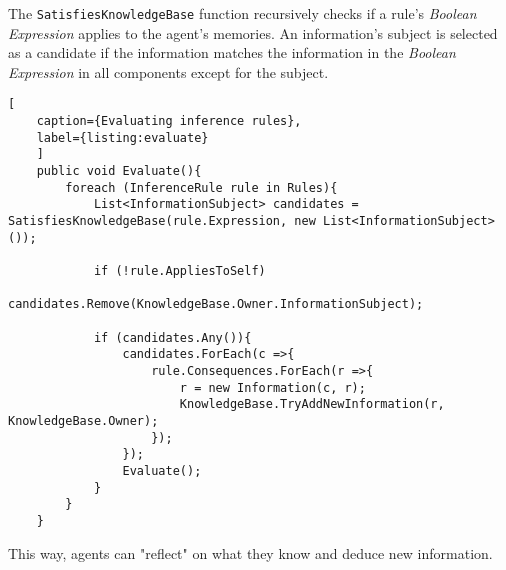 The \verb|SatisfiesKnowledgeBase| function recursively checks if a rule's \textit{Boolean Expression} applies to the agent's memories. An information's subject is selected as a candidate if the information matches the information in the \textit{Boolean Expression} in all components except for the subject.
\begin{lstlisting}[
	caption={Evaluating inference rules},
	label={listing:evaluate}
	]
	public void Evaluate(){
		foreach (InferenceRule rule in Rules){
			List<InformationSubject> candidates = SatisfiesKnowledgeBase(rule.Expression, new List<InformationSubject>());
			
			if (!rule.AppliesToSelf)
				candidates.Remove(KnowledgeBase.Owner.InformationSubject);
			
			if (candidates.Any()){
				candidates.ForEach(c =>{
					rule.Consequences.ForEach(r =>{
						r = new Information(c, r);
						KnowledgeBase.TryAddNewInformation(r, KnowledgeBase.Owner);
					});
				});
				Evaluate();
			}
		}
	}
\end{lstlisting}
This way, agents can "reflect" on what they know and deduce new information.
